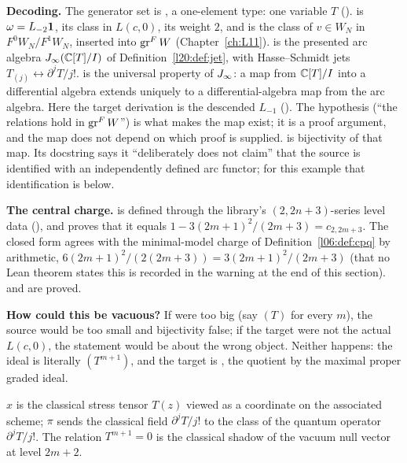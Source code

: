 \begin{dictionary}
\textbf{Decoding.} The generator set is , a one-element type: one variable $T$ ().
 is $\omega=L_{-2}\mathbf{1}$,  its class in $L(c,0)$,  its weight $2$, and
 is the class of $v\in W_N$ in $F^0W_N/F^1W_N$, inserted into $\operatorname{gr}^F W$
(Chapter~\ref{ch:L11}).  is the presented arc algebra $J_\infty({\mathbb{C}}[T]/I)$ of
Definition~\ref{l20:def:jet}, with Hasse--Schmidt jets $T_{(j)}\leftrightarrow\partial^jT/j!$.
 is the universal property of $J_\infty$: a map from ${\mathbb{C}}[T]/I$ into a differential
algebra extends uniquely to a differential-algebra map from the arc algebra. Here the target derivation is the descended
$L_{-1}$ (). The hypothesis  (``the relations hold in $\operatorname{gr}^F W$'') is
what makes the map exist; it is a proof argument, and the map does not depend on which proof is supplied.
 is bijectivity of that map. Its docstring says it ``deliberately does not claim'' that the
source is identified with an independently defined arc functor; for this example that identification is
 below.

\textbf{The central charge.}  is defined through the library's $(2,2n+3)$-series level data
(), and  proves that it equals $1-3(2m+1)^2/(2m+3)=c_{2,2m+3}$. The closed form agrees with the
minimal-model charge of Definition~\ref{l06:def:cpq} by arithmetic, $6(2m+1)^2/(2(2m+3))=3(2m+1)^2/(2m+3)$ (that no Lean
theorem states this is recorded in the warning at the end of this section).  and  are proved.

\textbf{How could this be vacuous?} If  were too big (say $(T)$ for every $m$), the source would be
too small and bijectivity false; if the target were not the actual $L(c,0)$, the statement would be about the wrong
object. Neither happens: the ideal is literally $(T^{m+1})$, and the target is , the quotient by
the maximal proper graded ideal.
\end{dictionary}

\begin{physics}
$x$ is the classical stress tensor $T(z)$ viewed as a coordinate on the associated scheme; $\pi$ sends the classical
field $\partial^jT/j!$ to the class of the quantum operator $\partial^jT/j!$. The relation $T^{m+1}=0$ is the classical
shadow of the vacuum null vector at level $2m+2$.
\end{physics}

